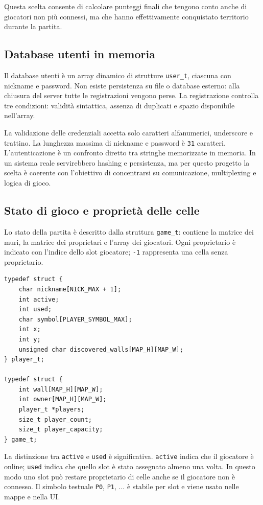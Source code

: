 \documentclass[11pt,a4paper]{article}
\begin{document}
Questa scelta consente di calcolare punteggi finali che tengono conto anche di giocatori non più connessi, ma che hanno effettivamente conquistato territorio durante la partita.

\subsection{Database utenti in memoria}

Il database utenti è un array dinamico di strutture \texttt{user\_t}, ciascuna con nickname e password. Non esiste persistenza su file o database esterno: alla chiusura del server tutte le registrazioni vengono perse. La registrazione controlla tre condizioni: validità sintattica, assenza di duplicati e spazio disponibile nell'array.

La validazione delle credenziali accetta solo caratteri alfanumerici, underscore e trattino. La lunghezza massima di nickname e password è \texttt{31} caratteri. L'autenticazione è un confronto diretto tra stringhe memorizzate in memoria. In un sistema reale servirebbero hashing e persistenza, ma per questo progetto la scelta è coerente con l'obiettivo di concentrarsi su comunicazione, multiplexing e logica di gioco.

\subsection{Stato di gioco e proprietà delle celle}

Lo stato della partita è descritto dalla struttura \texttt{game\_t}: contiene la matrice dei muri, la matrice dei proprietari e l'array dei giocatori. Ogni proprietario è indicato con l'indice dello slot giocatore; \texttt{-1} rappresenta una cella senza proprietario.

\begin{lstlisting}[caption={Strutture principali del gioco, tratte da \texttt{game.h}.}]
typedef struct {
    char nickname[NICK_MAX + 1];
    int active;
    int used;
    char symbol[PLAYER_SYMBOL_MAX];
    int x;
    int y;
    unsigned char discovered_walls[MAP_H][MAP_W];
} player_t;

typedef struct {
    int wall[MAP_H][MAP_W];
    int owner[MAP_H][MAP_W];
    player_t *players;
    size_t player_count;
    size_t player_capacity;
} game_t;
\end{lstlisting}

La distinzione tra \texttt{active} e \texttt{used} è significativa. \texttt{active} indica che il giocatore è online; \texttt{used} indica che quello slot è stato assegnato almeno una volta. In questo modo uno slot può restare proprietario di celle anche se il giocatore non è connesso. Il simbolo testuale \texttt{P0}, \texttt{P1}, ... è stabile per slot e viene usato nelle mappe e nella UI.
\end{document}
